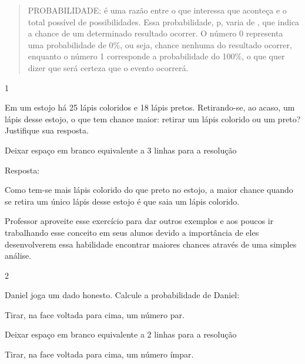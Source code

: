 \begin{escolha}
{

\begin{quote}
PROBABILIDADE: é uma razão entre o que interessa que aconteça e o total
possível de possibilidades. Essa probabilidade, p, varia de , que indica
a chance de um determinado resultado ocorrer. O número 0 representa uma
probabilidade de 0\%, ou seja, chance nenhuma do resultado ocorrer,
enquanto o número 1 corresponde a probabilidade do 100\%, o que quer
dizer que será certeza que o evento ocorrerá.
\end{quote}}


\num{1}

Em um estojo há 25 lápis coloridos e 18 lápis pretos. Retirando-se, ao
acaso, um lápis desse estojo, o que tem chance maior: retirar um lápis
colorido ou um preto? Justifique sua resposta.

Deixar espaço em branco equivalente a 3 linhas para a resolução

Resposta:

Como tem-se mais lápis colorido do que preto no estojo, a maior chance
quando se retira um único lápis desse estojo é que saia um lápis
colorido.

Professor aproveite esse exercício para dar outros exemplos e aos poucos
ir trabalhando esse conceito em seus alunos devido a importância de eles
desenvolverem essa habilidade encontrar maiores chances através de uma
simples análise.

\num{2}

Daniel joga um dado honesto. Calcule a probabilidade de Daniel:

\begin{escolha}

\item
  Tirar, na face voltada para cima, um número par.
\end{escolha}

Deixar espaço em branco equivalente a 2 linhas para a resolução

\begin{escolha}

\item
  Tirar, na face voltada para cima, um número ímpar.
\end{escolha}


\end{escolha}
